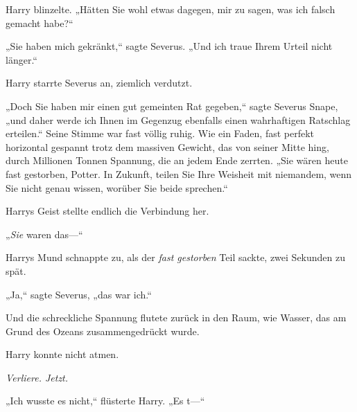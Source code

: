 Harry blinzelte. „Hätten Sie wohl etwas dagegen, mir zu sagen, was ich falsch gemacht habe?“

„Sie haben mich gekränkt,“ sagte Severus. „Und ich traue Ihrem Urteil nicht länger.“

Harry starrte Severus an, ziemlich verdutzt.

„Doch Sie haben mir einen gut gemeinten Rat gegeben,“ sagte Severus Snape, „und daher werde ich Ihnen im Gegenzug ebenfalls einen wahrhaftigen Ratschlag erteilen.“ Seine Stimme war fast völlig ruhig. Wie ein Faden, fast perfekt horizontal gespannt trotz dem massiven Gewicht, das von seiner Mitte hing, durch Millionen Tonnen Spannung, die an jedem Ende zerrten. „Sie wären heute fast gestorben, Potter. In Zukunft, teilen Sie Ihre Weisheit mit niemandem, wenn Sie nicht genau wissen, worüber Sie beide sprechen.“

Harrys Geist stellte endlich die Verbindung her.

„\emph{Sie} waren das—“

Harrys Mund schnappte zu, als der \emph{fast gestorben} Teil sackte, zwei Sekunden zu spät.

„Ja,“ sagte Severus, „das war ich.“

Und die schreckliche Spannung flutete zurück in den Raum, wie Wasser, das am Grund des Ozeans zusammengedrückt wurde.

Harry konnte nicht atmen.

\emph{Verliere. Jetzt.}

„Ich wusste es nicht,“ flüsterte Harry. „Es t—“

